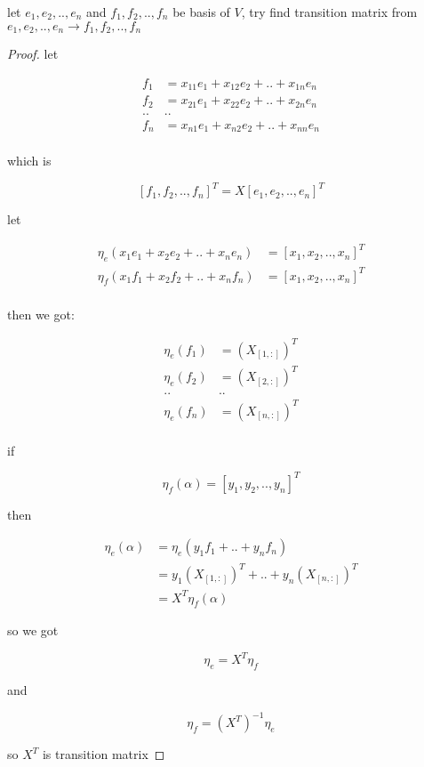 \begin{exercise}
    let $e_1,e_2,..,e_n$ and $f_1,f_2,..,f_n$ be basis of $V$, try find transition matrix from $e_1,e_2,..,e_n \to f_1,f_2,..,f_n$
\end{exercise}

\begin{proof}
    let 

    \begin{align*}
        f_1 &= x_{11}e_1 + x_{12}e_2 + .. + x_{1n}e_n \\
        f_2 &= x_{21}e_1 + x_{22}e_2 + .. + x_{2n}e_n \\
        .. & .. \\
        f_n &= x_{n1}e_1 + x_{n2}e_2 + .. + x_{nn}e_n \\
    \end{align*}

    which is 

    \[
        [f_1, f_2, .., f_n]^T = X[e_1,e_2,..,e_n]^T
    \]

    let 

    \begin{align*}
        \eta_e(x_1e_1 + x_2e_2 + .. + x_ne_n) &= [x_1,x_2,..,x_n]^T \\
        \eta_f(x_1f_1 + x_2f_2 + .. + x_nf_n) &= [x_1,x_2,..,x_n]^T \\
    \end{align*}

    then we got:

    \begin{align*}
        \eta_e(f_1) &= (X_{[1,:]})^T \\
        \eta_e(f_2) &= (X_{[2,:]})^T \\
            .. & .. \\
        \eta_e(f_n) &= (X_{[n,:]})^T \\
    \end{align*}

    if 

    \[
        \eta_f(\alpha) = [y_1,y_2,..,y_n]^T
    \]

    then

    \begin{align*}
        \eta_e(\alpha) &= \eta_e(y_1f_1+..+y_nf_n) \\
        &= y_1(X_{[1,:]})^T + .. + y_n(X_{[n,:]})^T \\
        &= X^T \eta_f(\alpha)
    \end{align*}

    so we got

    \[
        \eta_e = X^T \eta_f
    \]

    and

    \[
        \eta_f = (X^T)^{-1}\eta_e
    \]

    so $X^T$ is transition matrix
\end{proof}

